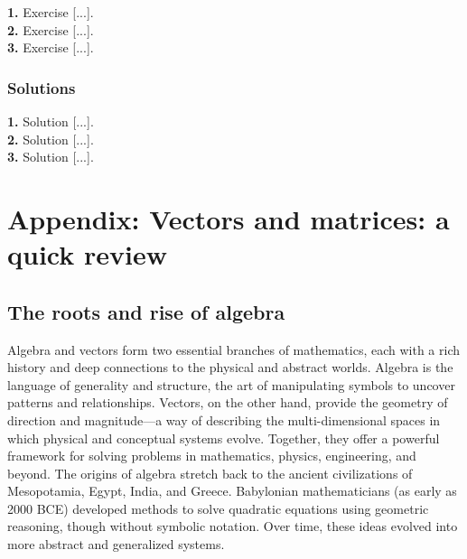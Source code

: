 \documentclass{book}
\begin{document}
\textbf{1.} Exercise [...].\\

\textbf{2.} Exercise [...].\\

\textbf{3.} Exercise [...].\\

\newpage

\subsection*{Solutions}

\textbf{1.} Solution [...].\\

\textbf{2.} Solution [...].\\

\textbf{3.} Solution [...].\\



\appendix



\chapter{Appendix: Vectors and matrices: a quick review}

\section{The roots and rise of algebra}

Algebra and vectors form two essential branches of mathematics, each with a rich history and deep connections to the physical and abstract worlds. Algebra is the language of generality and structure, the art of manipulating symbols to uncover patterns and relationships. Vectors, on the other hand, provide the geometry of direction and magnitude---a way of describing the multi-dimensional spaces in which physical and conceptual systems evolve. Together, they offer a powerful framework for solving problems in mathematics, physics, engineering, and beyond. The origins of algebra stretch back to the ancient civilizations of Mesopotamia, Egypt, India, and Greece. Babylonian mathematicians (as early as 2000 BCE) developed methods to solve quadratic equations using geometric reasoning, though without symbolic notation. Over time, these ideas evolved into more abstract and generalized systems.\\
\end{document}
